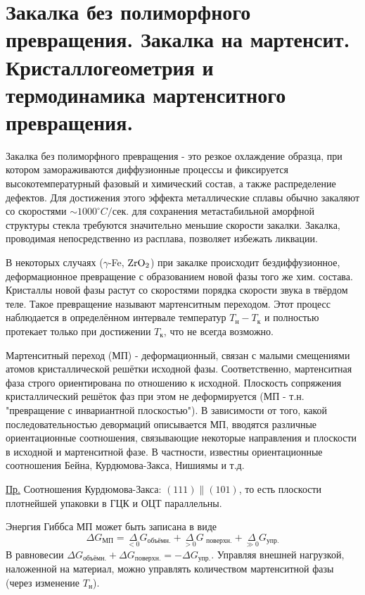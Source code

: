 \section{Закалка без полиморфного превращения. Закалка на мартенсит.
Кристаллогеометрия и термодинамика мартенситного превращения.}
Закалка без полиморфного превращения - это резкое охлаждение образца, при котором замораживаются диффузионные процессы и фиксируется высокотемпературный фазовый и химический состав, а также распределение дефектов. Для достижения этого эффекта металлические сплавы обычно закаляют со скоростями $\sim 1000 ^\circ C/\text{сек}$. для сохранения метастабильной аморфной структуры стекла требуются значительно меньшие скорости закалки. Закалка, проводимая непосредственно из расплава, позволяет избежать ликвации.
\par
В некоторых случаях ($\gamma$-Fe, $\rm ZrO_2$) при закалке происходит бездиффузионное, деформационное превращение с образованием новой фазы того же хим. состава. Кристаллы новой фазы растут со скоростями порядка скорости звука в твёрдом теле. Такое превращение называют мартенситным переходом. Этот процесс наблюдается в определённом интервале температур $T_\text{н}-T_\text{к}$ и полностью протекает только при достижении $T_\text{к}$, что не всегда возможно. 
\par
Мартенситный переход (МП) - деформационный, связан с малыми смещениями атомов кристаллической решётки исходной фазы. Соответственно, мартенситная фаза строго ориентирована по отношению к исходной. Плоскость сопряжения кристаллический решёток фаз при этом не деформируется (МП - т.н. "превращение с инвариантной плоскостью"). В зависимости от того, какой последовательностью девормаций описывается МП, вводятся различные ориентационные соотношения, связывающие некоторые направления и плоскости в исходной и мартенситной фазе. В частности, известны ориентационные соотношения Бейна, Курдюмова-Закса, Нишиямы и т.д.
\par \underline{Пр.} Соотношения Курдюмова-Закса: $(111) \parallel (101)$, то есть плоскости плотнейшей упаковки в ГЦК и ОЦТ параллельны.
\par
Энергия Гиббса МП может быть записана в виде
\begin{equation}
\Delta G_{\text{МП}} = \underset{<0}\Delta G_{\text{объёмн.}} + \underset{>0}\Delta G_{\text{ поверхн.}} + \underset{\gg 0}\Delta G _{\text{упр.}}
\label{eq:Gibbs_martensite}  
\end{equation}
В равновесии $\Delta G_{\text{объёмн.}}+ \Delta G_{\text{поверхн.}}= -\Delta G _{\text{упр.}}$. Управляя внешней нагрузкой, наложенной на материал, можно управлять количеством мартенситной фазы (через изменение $T_\text{н}$).

